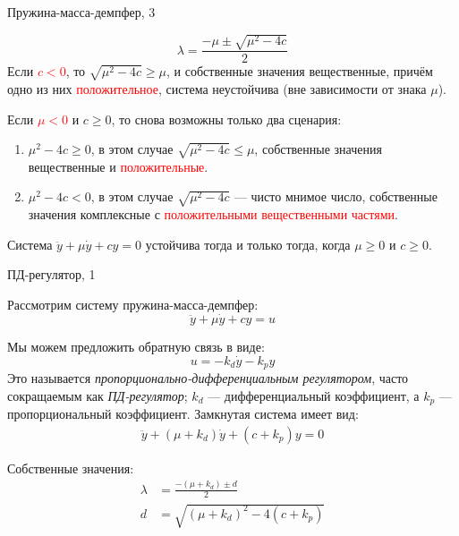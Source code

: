 \documentclass{beamer}
\begin{document}
\begin{frame}{Пружина-масса-демпфер, 3}
	\begin{flushleft}
		
		$$\lambda = \frac{-\mu \pm \sqrt{\mu^2 - 4 c} }{2}$$
		Если \textcolor{red}{$c < 0$}, то $\sqrt{\mu^2 - 4c} \geq \mu$, и собственные значения вещественные, причём одно из них \textcolor{red}{положительное}, система неустойчива (вне зависимости от знака $\mu$).
		
		\bigskip
		
		Если \textcolor{red}{$\mu < 0$} и $c \geq 0$, то снова возможны только два сценария: 
		
		\begin{enumerate}
			\item $\mu^2 - 4c \geq 0$, в этом случае $\sqrt{\mu^2 - 4c} \leq \mu$, собственные значения вещественные и \textcolor{red}{положительные}.
			\item $\mu^2 - 4c < 0$, в этом случае $\sqrt{\mu^2 - 4c}$ — чисто мнимое число, собственные значения комплексные с \textcolor{red}{положительными вещественными частями}.
		\end{enumerate}
		
		\begin{definition}
			Система $\ddot y + \mu \dot y + c y = 0$ устойчива тогда и только тогда, когда $\mu \geq 0$ и $c \geq 0$.
		\end{definition}
		
	\end{flushleft}
\end{frame}



\begin{frame}{ПД-регулятор, 1}
	\begin{flushleft}
		
		Рассмотрим систему пружина-масса-демпфер:
		\begin{equation}
			\ddot y + \mu \dot y + c y = u
		\end{equation}
		
		Мы можем предложить обратную связь в виде:
		\begin{equation}
			u = -k_d \dot y  -k_p y 
		\end{equation}
		Это называется \emph{пропорционально-дифференциальным регулятором}, часто сокращаемым как \emph{ПД-регулятор}; $k_d$ — дифференциальный коэффициент, а $k_p$ — пропорциональный коэффициент. Замкнутая система имеет вид:
		\begin{align}
			\ddot y + (\mu + k_d) \dot y + (c+k_p) y = 0
		\end{align}
		
		Собственные значения:
		\begin{align}
			\lambda &= \frac{-(\mu + k_d) \pm d}{2} 
			\\
			d &= \sqrt{(\mu + k_d)^2 - 4 (c+k_p)}
		\end{align}
		
		
	\end{flushleft}
\end{frame}
\end{document}

